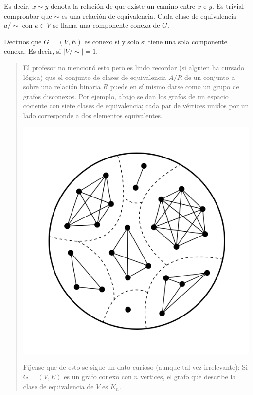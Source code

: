 \documentclass[a4paper, 12pt]{article}
\begin{document}
Es decir, $x \sim y$ denota la relación de que existe un camino entre $x$ e $y$.
Es trivial comproabar que $\sim$ es una relación de equivalencia. Cada clase de
equivalencia $a / \sim$ con $a \in V$ se llama una componente conexa de $G$.

\begin{definition}
    Decimos que $G = (V, E) $ es conexo si y solo si tiene una sola componente
    conexa. Es decir, si $|V / \sim | = 1$.
\end{definition}


\small
\begin{quote}

El profesor no mencionó esto pero es lindo recordar (si alguien ha cursado
lógica) que el conjunto de clases de equivalencia $A / R$ de un conjunto a sobre
una relación binaria $R$ puede en sí mismo darse como un grupo de grafos
disconexos. Por ejemplo, abajo se dan los grafos de un espacio cociente con
siete clases de equivalencia; cada par de vértices unidos por un lado
corresponde a dos elementos equivalentes.


\begin{center}
\includegraphics[scale=0.25]{equiv}
\end{center}

Fíjense que de esto se sigue un dato curioso (aunque tal vez irrelevante): Si
$G = (V, E) $ es un grafo conexo con $n$ vértices, el grafo que describe la clase de
equivalencia de $V$ es $K_n$.

\end{quote}
\normalsize
\end{document}
